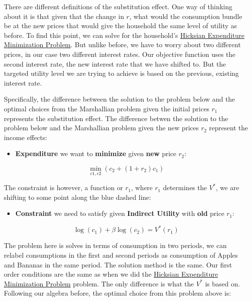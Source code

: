 \documentclass[
]{book}
\providecommand{\tightlist}{%
  \setlength{\itemsep}{0pt}\setlength{\parskip}{0pt}}
\begin{document}
There are different definitions of the substitution effect. One way of
thinking about it is that given that the change in \(r\), what would the
consumption bundle be at the new prices that would give the household
the same level of utility as before. To find this point, we can solve
for the household's \href{https://fanwangecon.github.io/Math4Econ/opti_hh_constrained_brsv/household_c1_c2_constrained_expmin.html}{Hicksian Expenditure Minimization
Problem}.
But unlike before, we have to worry about two different prices, in our
case two different interest rates. Our objective function uses the
second interest rate, the new interest rate that we have shifted to. But
the targeted utility level we are trying to achieve is based on the
previous, existing interest rate.

Specifically, the difference between the solution to the problem below
and the optimal choices from the Marshallian problem given the initial
prices \(r_1\) represents the substitution effect. The difference betwen
the solution to the problem below and the Marshallian problem given the
new prices \(r_2\) represent the income effects:

\begin{itemize}
\tightlist
\item
  \textbf{Expenditure} we want to \textbf{minimize} given \textbf{new} price \(r_2\):
\end{itemize}

\[\min_{c1,c2} \left(c_2 +(1+r_2 )c_1 \right)\]

The constraint is however, a function or \(r_1\), where \(r_1\) determines
the \(V^*\), we are shifting to some point along the blue dashed line:

\begin{itemize}
\tightlist
\item
  \textbf{Constraint} we need to satisfy given \textbf{Indirect Utility} with
  \textbf{old} price \(r_1\):
\end{itemize}

\[\log (c_1 )+\beta \log (c_2 )=V^* (r_1 )\]

The problem here is solves in terms of consumption in two periods, we
can relabel consumptions in the first and second periods as consumption
of Apples and Bananas in the same period. The solution method is the
same. Our first order conditions are the same as when we did the
\href{https://fanwangecon.github.io/Math4Econ/opti_hh_constrained_brsv/household_c1_c2_constrained_expmin.html}{Hicksian Expenditure Minimization
Problem}
problem. The only difference is what the \(V^{\ast }\) is based on.
Following our algebra before, the optimal choice from this problem above
is:
\end{document}
